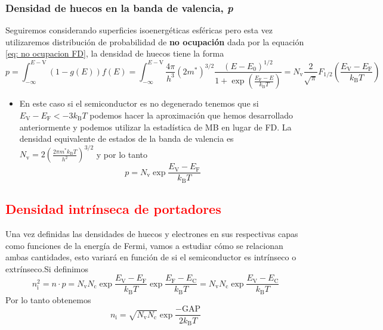 \subsubsection{Densidad de huecos en la banda de valencia, \textit{p}} \label{sec: Densidad de huecos enn la banda de valencia}
Seguiremos considerando superficies isoenergéticas esféricas pero esta vez utilizaremos distribución de probabilidad de \textbf{no ocupación} dada por la equación \ref{eq: no ocupacion FD}, la densidad de huecos tiene la forma
\begin{equation}
p=\int_{-\infty}^{E-\mathrm{V}}(1-g(E))f(E)=\int_{-\infty}^{E-\mathrm{V}} \frac{4\pi}
{h^3} (2m^*)^{3/2}\frac{(E- E_0)^{1/2}}{1+\exp\left( \frac{E_\mathrm{F}-E}{k_\mathrm{B}T}\right)}=N_\mathrm{v} \frac{2}{\sqrt{\pi}} F_{1/2} \left(\frac{E_\mathrm{V}-E_\mathrm{F}}{k_\mathrm{B}T}\right)
\end{equation}
\begin{itemize}
    \item En este caso si el semiconductor es no degenerado tenemos que si $E_\mathrm{V}-E_\mathrm{F}<-3k_\mathrm{B}T$ podemos hacer la aproximación que hemos desarrollado anteriormente y podemos utilizar la estadística de MB en lugar de FD. La densidad equivalente de estados de la banda de valencia es $N_\mathrm{v}=2\left(\frac{2\pi m^* k_\mathrm{B} T}{h^2}\right)^{3/2}$ y por lo tanto
    \begin{equation}
           p=N_\mathrm{v} \exp{\frac{E_\mathrm{V}-E_\mathrm{F}}{k_\mathrm{B}T}} 
           \label{eq: densidad de huecos MB}
    \end{equation}
\end{itemize}

\subsection{\textcolor{red}{Densidad intrínseca de portadores}} \label{sec: Densidad intrinseca de portadores}
Una vez definidas las densidades de huecos y electrones en sus respectivas capas como funciones de la energía de Fermi, vamos a estudiar cómo se relacionan ambas cantidades, esto variará en función de si el semiconductor es intrínseco o extrínseco.Si definimos \begin{equation}
    n_\mathrm{i}^2=n\cdot p=N_\mathrm{v} N_\mathrm{c} \exp{\frac{E_\mathrm{V}-E_\mathrm{F}}{k_\mathrm{B}T}} \exp{\frac{E_\mathrm{F}-E_\mathrm{C}}{k_\mathrm{B}T}}=N_\mathrm{v} N_\mathrm{c} \exp{\frac{E_\mathrm{V}-E_\mathrm{C}}{k_\mathrm{B}T}}
    \label{eq: Densidad intrinseca de portadores}
\end{equation}
Por lo tanto obtenemos $$n_\mathrm{i}=\sqrt{N_\mathrm{v} N_\mathrm{c}} \exp{\frac{-\mathrm{GAP}}{2k_\mathrm{B}T}}$$

